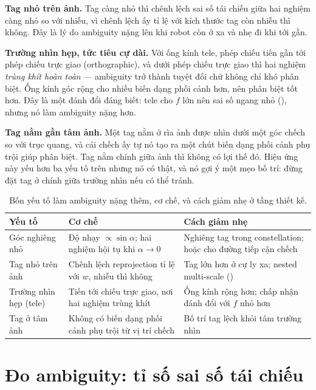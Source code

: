 \documentclass[../../marker.tex]{subfiles}
\begin{document}
\textbf{Tag nhỏ trên ảnh.} Tag càng nhỏ thì chênh lệch sai số tái chiếu giữa hai nghiệm càng nhỏ so với nhiễu, vì chênh lệch ấy tỉ lệ với kích thước tag còn nhiễu thì không. Đây là lý do ambiguity nặng lên khi robot còn ở xa và nhẹ đi khi tới gần.

\textbf{Trường nhìn hẹp, tức tiêu cự dài.} Với ống kính tele, phép chiếu tiến gần tới phép chiếu trực giao (orthographic), và dưới phép chiếu trực giao thì hai nghiệm \emph{trùng khít hoàn toàn} --- ambiguity trở thành tuyệt đối chứ không chỉ khó phân biệt. Ống kính góc rộng cho nhiều biến dạng phối cảnh hơn, nên phân biệt tốt hơn. Đây là một đánh đổi đáng biết: tele cho \(f\) lớn nên sai số ngang nhỏ (), nhưng nó làm ambiguity nặng hơn.

\textbf{Tag nằm gần tâm ảnh.} Một tag nằm ở rìa ảnh được nhìn dưới một góc chếch so với trục quang, và cái chếch ấy tự nó tạo ra một chút biến dạng phối cảnh phụ trội giúp phân biệt. Tag nằm chính giữa ảnh thì không có lợi thế đó. Hiệu ứng này yếu hơn ba yếu tố trên nhưng nó có thật, và nó gợi ý một mẹo bố trí: đừng đặt tag ở chính giữa trường nhìn nếu có thể tránh.

\begin{table}[H]\centering\small
\caption{Bốn yếu tố làm ambiguity nặng thêm, cơ chế, và cách giảm nhẹ ở tầng thiết kế.}
\label{tab:a04-yeu-to}
\begin{tabularx}{\linewidth}{@{}L{3.0cm}L{4.6cm}Y@{}}
\toprule
\textbf{Yếu tố} & \textbf{Cơ chế} & \textbf{Cách giảm nhẹ}\\
\midrule
Góc nghiêng nhỏ & Độ nhạy \(\propto \sin\alpha\); hai nghiệm hội tụ khi \(\alpha\to 0\) & Nghiêng tag trong constellation; hoặc cho đường tiếp cận chếch\\
Tag nhỏ trên ảnh & Chênh lệch reprojection tỉ lệ với \(w\), nhiễu thì không & Tag lớn hơn ở cự ly xa; nested multi-scale ()\\
Trường nhìn hẹp (tele) & Tiến tới chiếu trực giao, nơi hai nghiệm trùng khít & Ống kính rộng hơn; chấp nhận đánh đổi với \(f\) nhỏ hơn\\
Tag ở tâm ảnh & Không có biến dạng phối cảnh phụ trội từ vị trí chếch & Bố trí tag lệch khỏi tâm trường nhìn\\
\bottomrule
\end{tabularx}
\end{table}

\section{Đo ambiguity: tỉ số sai số tái chiếu}
\end{document}
